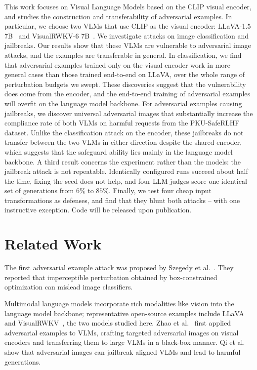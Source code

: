 \documentclass[conference]{IEEEtran}
\begin{document}
This work focuses on Visual Language Models based on the CLIP visual
encoder, and studies the construction and transferability of adversarial
examples. In particular, we choose two VLMs that use CLIP as the visual
encoder: LLaVA-1.5 7B~\cite{Liu2024LLaVA15} and VisualRWKV-6
7B~\cite{Hou2025VisualRWKV}. We investigate attacks on image classification
and jailbreaks. Our results show that these VLMs are vulnerable to
adversarial image attacks, and the examples are transferable in general. In
classification, we find that adversarial examples trained only on the
visual encoder work in more general cases than those trained end-to-end on
LLaVA, over the whole range of perturbation budgets we swept. These
discoveries suggest
that the vulnerability does come from the encoder, and the end-to-end
training of adversarial examples will overfit on the language model
backbone. For adversarial examples causing jailbreaks, we discover
universal adversarial images that substantially increase the compliance
rate of both VLMs on harmful requests from the PKU-SafeRLHF dataset. Unlike
the classification attack on the encoder, these jailbreaks do not transfer
between the two VLMs in either direction despite the shared encoder, which
suggests that the safeguard ability lies mainly in the language model
backbone. A third result concerns the experiment rather than the models: the jailbreak
attack is not repeatable. Identically configured runs succeed about half the
time, fixing the seed does not help, and four LLM judges score one identical
set of generations from $6\%$ to $85\%$.
Finally, we test four cheap input transformations as defenses, and find that
they blunt both attacks -- with one instructive exception.
Code will be released upon publication.

\section{Related Work}

The first adversarial example attack was proposed by Szegedy et
al.~\cite{Szegedy2014Intriguing}. They reported that imperceptible
perturbation obtained by box-constrained optimization can mislead image
classifiers.

Multimodal language models incorporate rich modalities like vision into the
language model backbone; representative open-source examples include
LLaVA~\cite{Liu2024LLaVA15} and VisualRWKV~\cite{Hou2025VisualRWKV}, the two
models studied here. Zhao et al.~\cite{Zhao2023EvalAdvVLM} first
applied adversarial examples to VLMs, crafting targeted adversarial images
on visual encoders and transferring them to large VLMs in a black-box
manner. Qi et al.~\cite{Qi2024VisualJailbreak} show that adversarial images
can jailbreak aligned VLMs and lead to harmful generations.
\end{document}
